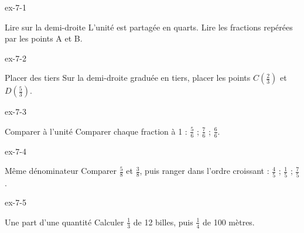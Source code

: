\clearpage{}
\begin{blocLivre}{ex-7-1}\begin{exercice}[1]{Lire sur la demi-droite}
L’unité est partagée en quarts. Lire les fractions repérées par les points A et B.
\label{fig-ex-7-1}
\end{exercice}\end{blocLivre}
\begin{blocLivre}{ex-7-2}\begin{exercice}[1]{Placer des tiers}
Sur la demi-droite graduée en tiers, placer les points $C\left(\frac23\right)$ et $D\left(\frac53\right)$.
\label{fig-ex-7-2}
\end{exercice}\end{blocLivre}
\begin{blocLivre}{ex-7-3}\begin{exercice}[1]{Comparer à l’unité}
Comparer chaque fraction à 1 : $\frac56$ ; $\frac76$ ; $\frac66$.
\end{exercice}\end{blocLivre}
\begin{blocLivre}{ex-7-4}\begin{exercice}[1]{Même dénominateur}
Comparer $\frac58$ et $\frac38$, puis ranger dans l’ordre croissant : $\frac45$ ; $\frac15$ ; $\frac75$.
\end{exercice}\end{blocLivre}
\begin{blocLivre}{ex-7-5}\begin{exercice}[1]{Une part d’une quantité}
Calculer $\frac13$ de 12 billes, puis $\frac14$ de 100 mètres.
\end{exercice}\end{blocLivre}

